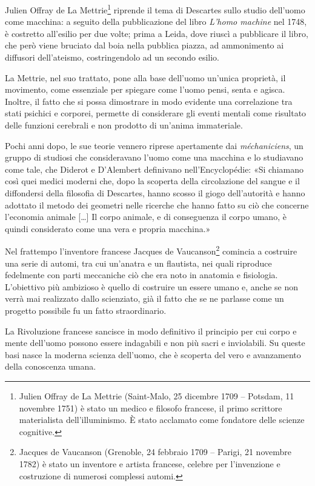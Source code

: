 Julien Offray de La Mettrie\footnote{Julien Offray de La Mettrie (Saint-Malo, 25 dicembre 1709 – Potsdam, 11 novembre 1751) è stato un medico e filosofo francese, il primo scrittore materialista dell'illuminismo. È stato acclamato come fondatore delle scienze cognitive.} riprende il tema di Descartes sullo studio dell'uomo come macchina: a seguito della pubblicazione del libro \emph{L'homo machine} nel 1748, è costretto all'esilio per due volte; prima a Leida, dove riuscì a pubblicare il libro, che però viene bruciato dal boia nella pubblica piazza, ad ammonimento ai diffusori dell'ateismo, costringendolo ad un secondo esilio.

La Mettrie, nel suo trattato, pone alla base dell'uomo un'unica proprietà, il movimento, come essenziale per spiegare come l'uomo pensi, senta e agisca. Inoltre, il fatto che si possa dimostrare in modo evidente una correlazione tra stati psichici e corporei, permette di considerare gli eventi mentali come risultato delle funzioni cerebrali e non prodotto di un'anima immateriale.

Pochi anni dopo, le sue teorie vennero riprese apertamente dai \emph{méchaniciens}, un gruppo di studiosi che consideravano l'uomo come una macchina e lo studiavano come tale, che Diderot e D'Alembert definivano nell'Encyclopédie: «Si chiamano così quei medici moderni che, dopo la scoperta della circolazione del sangue e il diffondersi della filosofia di Descartes, hanno scosso il giogo dell'autorità e hanno adottato il metodo dei geometri nelle ricerche che hanno fatto su ciò che concerne l'economia animale [\dots] Il corpo animale, e di conseguenza il corpo umano, è quindi considerato come una vera e propria macchina.»

Nel frattempo l'inventore francese Jacques de Vaucanson\footnote{Jacques de Vaucanson (Grenoble, 24 febbraio 1709 – Parigi, 21 novembre 1782) è stato un inventore e artista francese, celebre per l'invenzione e costruzione di numerosi complessi automi.} comincia a costruire una serie di automi, tra cui un'anatra e un flautista, nei quali riproduce fedelmente con parti meccaniche ciò che era noto in anatomia e fisiologia. L'obiettivo più ambizioso è quello di costruire un essere umano e, anche se non verrà mai realizzato dallo scienziato, già il fatto che se ne parlasse come un progetto possibile fu un fatto straordinario.

La Rivoluzione francese sancisce in modo definitivo il principio per cui corpo e mente dell'uomo possono essere indagabili e non più sacri e inviolabili. Su queste basi nasce la moderna scienza dell'uomo, che è scoperta del vero e avanzamento della conoscenza umana.

